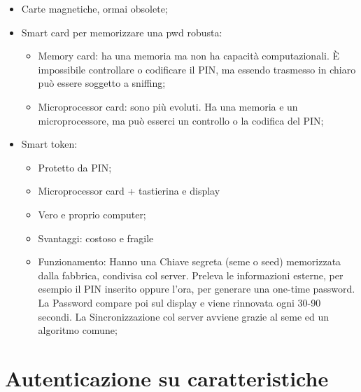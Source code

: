 \begin{itemize}
      \item Carte magnetiche, ormai obsolete;
      \item Smart card per memorizzare una pwd robusta:
            \begin{itemize}
                  \item Memory card: ha una memoria ma non ha capacità computazionali.
                        È impossibile
                        controllare o codificare il PIN, ma essendo trasmesso in chiaro può
                        essere soggetto
                        a sniffing;
                  \item Microprocessor card: sono più evoluti. Ha una memoria e
                        un microprocessore, ma
                        può esserci un controllo o la codifica del PIN;
            \end{itemize}
      \item Smart token:
            \begin{itemize}
                  \item Protetto da PIN;
                  \item  Microprocessor card + tastierina e display
                  \item  Vero e proprio computer;
                  \item  Svantaggi: costoso e fragile
                  \item  Funzionamento: Hanno una Chiave segreta (seme o seed)
                        memorizzata dalla fabbrica,
                        condivisa col server. Preleva le informazioni esterne,
                        per esempio il PIN inserito oppure
                        l'ora, per generare una one-time password.
                        La Password compare poi sul display e viene
                        rinnovata ogni 30-90 secondi.
                        La Sincronizzazione col server avviene grazie al seme ed un
                        algoritmo comune;
            \end{itemize}
\end{itemize}

\section{Autenticazione su caratteristiche}

